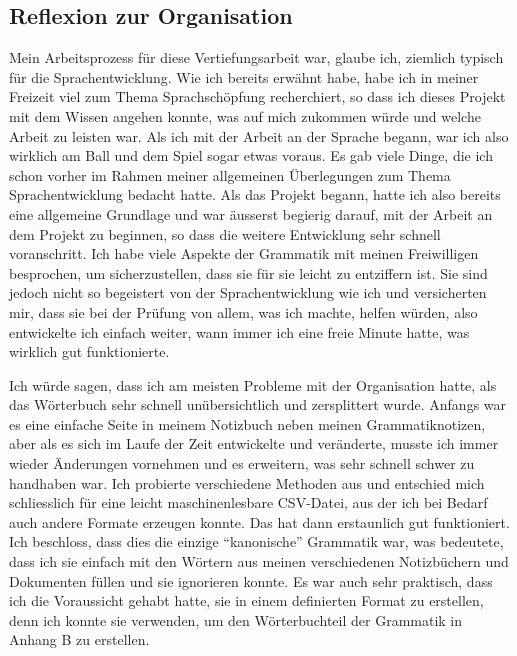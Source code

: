 \documentclass{article}
\begin{document}
\subsection{Reflexion zur Organisation}
Mein Arbeitsprozess für diese Vertiefungsarbeit war, glaube ich, ziemlich typisch für die Sprachentwicklung.
Wie ich bereits erwähnt habe, habe ich in meiner Freizeit viel zum Thema Sprachschöpfung recherchiert,
so dass ich dieses Projekt mit dem Wissen angehen konnte, was auf mich zukommen würde und welche Arbeit zu
leisten war. Als ich mit der Arbeit an der Sprache begann, war ich also wirklich am Ball und dem Spiel sogar
etwas voraus. Es gab viele Dinge, die ich schon vorher im Rahmen meiner allgemeinen Überlegungen zum Thema
Sprachentwicklung bedacht hatte. Als das Projekt begann, hatte ich also bereits eine allgemeine Grundlage
und war äusserst begierig darauf, mit der Arbeit an dem Projekt zu beginnen, so dass die weitere Entwicklung
sehr schnell voranschritt. Ich habe viele Aspekte der Grammatik mit meinen Freiwilligen besprochen,
um sicherzustellen, dass sie für sie leicht zu entziffern ist.
Sie sind jedoch nicht so begeistert von der Sprachentwicklung wie ich und versicherten mir, dass sie bei
der Prüfung von allem, was ich machte, helfen würden, also entwickelte ich einfach weiter, wann immer ich
eine freie Minute hatte, was wirklich gut funktionierte.

Ich würde sagen, dass ich am meisten Probleme mit der Organisation hatte,
als das Wörterbuch sehr schnell unübersichtlich und zersplittert wurde.
Anfangs war es eine einfache Seite in meinem Notizbuch neben meinen Grammatiknotizen,
aber als es sich im Laufe der Zeit entwickelte und veränderte, musste ich immer wieder Änderungen
vornehmen und es erweitern, was sehr schnell schwer zu handhaben war. Ich probierte verschiedene
Methoden aus und entschied mich schliesslich für eine leicht maschinenlesbare CSV-Datei,
aus der ich bei Bedarf auch andere Formate erzeugen konnte. Das hat dann erstaunlich gut funktioniert.
Ich beschloss, dass dies die einzige ``kanonische'' Grammatik war, was bedeutete, dass ich sie einfach mit
den Wörtern aus meinen verschiedenen Notizbüchern und Dokumenten füllen und sie ignorieren konnte.
Es war auch sehr praktisch, dass ich die Voraussicht gehabt hatte, sie in einem definierten Format
zu erstellen, denn ich konnte sie verwenden, um den Wörterbuchteil der Grammatik in Anhang B zu erstellen.
\end{document}
